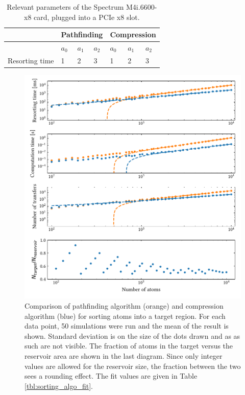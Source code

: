 \begin{table}[bt]
\label{tbl:spec_m4i}
\centering
\begin{tabular}{l|l|l|l|l|l|l}
	\hline \hline
	 & \multicolumn{3}{c}{Pathfinding} & \multicolumn{3}{c}{Compression} \\ \hline
	 & $a_0$ & $a_1$ & $a_2$ & $a_0$ & $a_1$ & $a_2$ \\
	 Resorting time & 1 & 2 & 3 & 1 & 2 & 3 \\
	\hline \hline
\end{tabular}
\caption{Relevant parameters of the Spectrum M4i.6600-x8 card, plugged into a PCIe x8 slot.}
\end{table}

\begin{figure}[h]
\label{fig:sorting_algos}
\centering
	\includegraphics{figures/sorting_algos_155.pdf}
	\caption{Comparison of pathfinding algorithm (orange) and compression algorithm (blue) for sorting atoms into a target region. For each data point, 50 simulations were run and the mean of the result is shown. Standard deviation is on the size of the dots drawn and as as such are not visible. The fraction of atoms in the target versus the reservoir area are shown in the last diagram. Since only integer values are allowed for the reservoir size, the fraction between the two sees a rounding effect. The fit values are given in Table \ref{tbl:sorting_algo_fit}.}
\end{figure}


